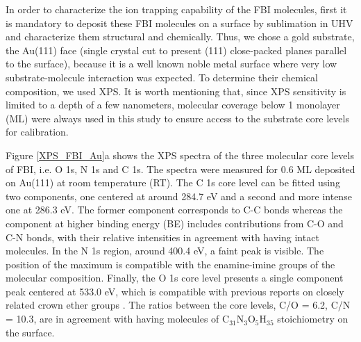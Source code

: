 \documentclass[aps,prl,reprint,longbibliography,superscriptaddress, english]{revtex4-1}
\begin{document}
In order to characterize the ion trapping capability of the FBI molecules, first it is mandatory to deposit these FBI molecules on a surface by sublimation in UHV and characterize them structural and chemically. Thus, we chose a gold substrate, the Au(111) face (single crystal cut to present (111) close-packed planes parallel to the surface), because it is a well known noble metal surface where very low substrate-molecule interaction was expected. To determine their chemical composition, we used XPS. It is worth mentioning that, since XPS sensitivity is limited to a depth of a few nanometers, molecular coverage below 1 monolayer (ML) were always used in this study to ensure access to the substrate core levels for calibration. 

Figure {\ref{XPS_FBI_Au}}a shows the XPS spectra of the three molecular core levels of FBI, i.e. O 1s, N 1s and C 1s. The spectra were measured for 0.6 ML deposited on Au(111) at room temperature (RT). The C 1s core level can be fitted using two components, one {centered} at around 284.7 eV and a second and more intense one at 286.3 eV. The former component corresponds to C-C bonds whereas the component at higher binding energy (BE) includes contributions from C-O and C-N bonds, with their relative intensities in agreement with having intact molecules. In the N 1s region, around 400.4 eV, a faint peak is visible. The position of the maximum is compatible with the {enamine-imine} groups of the molecular composition. Finally, the O 1s core level presents a single component peak centered at 533.0 eV, which is compatible with previous reports on closely related crown ether groups \cite{stredansky_-surface_2019}. The ratios between the core levels, C/O = 6.2, C/N = 10.3, are in agreement with having molecules of $ \mathrm{C_{31}N_{3}O_{5}H_{35}}$ stoichiometry on the surface. 
\end{document}
